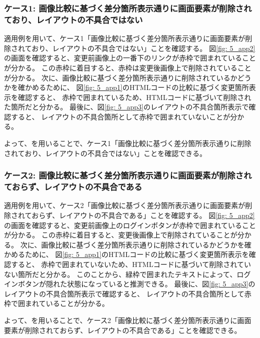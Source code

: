 \subsubsection*{ケース1: 画像比較に基づく差分箇所表示通りに画面要素が削除されており、レイアウトの不具合ではない}\label{sec:result_area_detection}
適用例を用いて、ケース1「画像比較に基づく差分箇所表示通りに画面要素が削除されており、レイアウトの不具合ではない」ことを確認する。
図\ref{fig: 5_app2}の画面を確認すると、変更前画像上の一番下のリンクが赤枠で囲まれていることが分かる。
この赤枠に着目すると、赤枠は変更後画像上で削除されていることが分かる。
次に、画像比較に基づく差分箇所表示通りに削除されているかどうかを確かめるために、
図\ref{fig: 5_app1}のHTMLコードの比較に基づく変更箇所表示を確認すると、
赤枠で囲まれているため、HTMLコードに基づいて削除された箇所だと分かる。
最後に、図\ref{fig: 5_app3}のレイアウトの不具合箇所表示で確認すると、
レイアウトの不具合箇所として赤枠で囲まれていないことが分かる。
\par
よって、\toolName を用いることで、ケース1「画像比較に基づく差分箇所表示通りに削除されており、レイアウトの不具合ではない」ことを確認できる。



\subsubsection*{ケース2: 画像比較に基づく差分箇所表示通りに画面要素が削除されておらず、レイアウトの不具合である}\label{sec:result_area2}
適用例を用いて、ケース2「画像比較に基づく差分箇所表示通りに画面要素が削除されておらず、レイアウトの不具合である」ことを確認する。
図\ref{fig: 5_app2}の画面を確認すると、変更前画像上のログインボタンが赤枠で囲まれていることが分かる。
この赤枠に着目すると、変更後画像上で削除されていることが分かる。
次に、画像比較に基づく差分箇所表示通りに削除されているかどうかを確かめるために、
図\ref{fig: 5_app1}のHTMLコードの比較に基づく変更箇所表示を確認すると、
赤枠で囲まれていないため、HTMLコードに基づいて削除されていない箇所だと分かる。
このことから、緑枠で囲まれたテキストによって、ログインボタンが隠れた状態になっていると推測できる。
最後に、図\ref{fig: 5_app3}のレイアウトの不具合箇所表示で確認すると、
レイアウトの不具合箇所として赤枠で囲まれていることが分かる。
\par
よって、\toolName を用いることで、ケース2「画像比較に基づく差分箇所表示通りに画面要素が削除されておらず、レイアウトの不具合である」ことを確認できる。


